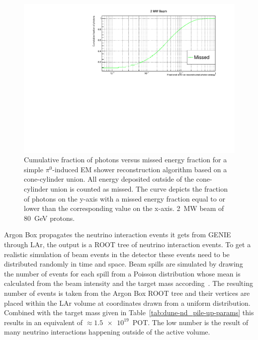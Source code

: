 \documentclass[a4paper]{article}
\begin{document}
\begin{figure}[tbp]
	\centering
	\includegraphics[width=\textwidth]{Figures/2MW/missed_rel_y}
	\caption[Pile-up study photon vs.\ missed energy fraction, \SI{2}{\mega\watt} beam]{%
		Cumulative fraction of photons versus missed energy fraction for a simple $\pi^0$-induced EM shower reconstruction algorithm based on a cone-cylinder union.
		All energy deposited outside of the cone-cylinder union is counted as missed.
		The curve depicts the fraction of photons on the y-axis with a missed energy fraction equal to or lower than the corresponding value on the x-axis.
		\SI{2}{\mega\watt} beam of \SI{80}{\giga\electronvolt} protons.
	}
	\label{fig:dune-nd_2MW_missed-rel-y}
\end{figure}

Argon Box propagates the neutrino interaction events it gets from GENIE through LAr, the output is a ROOT tree of neutrino interaction events.
To get a realistic simulation of beam events in the detector these events need to be distributed randomly in time and space.
Beam spills are simulated by drawing the number of events for each spill from a Poisson distribution whose mean is calculated from the beam intensity and the target mass according~\cite{DUNE3}.
The resulting number of events is taken from the Argon Box ROOT tree and their vertices are placed within the LAr volume at coordinates drawn from a uniform distribution.
Combined with the target mass given in Table~\ref{tab:dune-nd_pile-up-params} this results in an equivalent of $\approx \num{1.5e19}$~POT.
The low number is the result of many neutrino interactions happening outside of the active volume.
\end{document}
